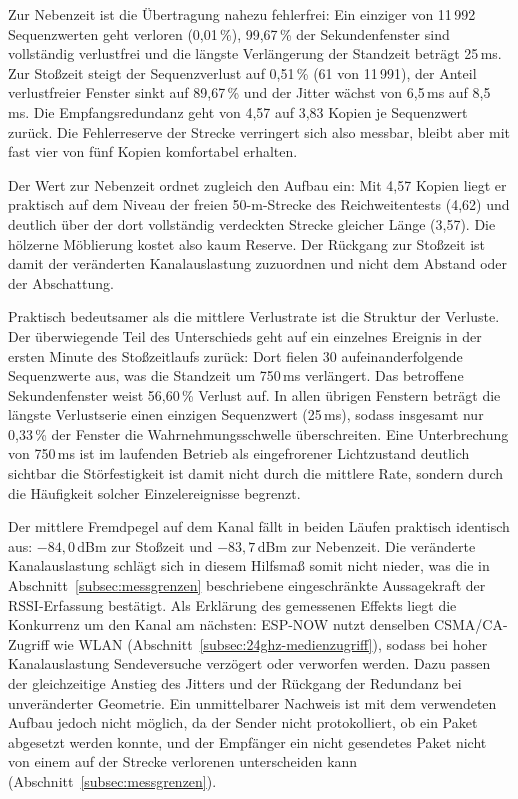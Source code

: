 Zur Nebenzeit ist die Übertragung nahezu fehlerfrei: Ein einziger von 11\,992
Sequenzwerten geht verloren (0,01\,\%), 99,67\,\% der Sekundenfenster sind
vollständig verlustfrei und die längste Verlängerung der Standzeit beträgt
25\,ms. Zur Stoßzeit
steigt der Sequenzverlust auf 0,51\,\% (61 von 11\,991), der Anteil verlustfreier
Fenster sinkt auf 89,67\,\% und der Jitter wächst von 6,5\,ms auf 8,5\,ms. Die
Empfangsredundanz geht von 4,57 auf 3,83 Kopien je Sequenzwert zurück. Die
Fehlerreserve der Strecke verringert sich also messbar, bleibt aber mit fast vier
von fünf Kopien komfortabel erhalten.

Der Wert zur Nebenzeit ordnet zugleich den Aufbau ein: Mit 4,57 Kopien liegt er
praktisch auf dem Niveau der freien 50-m-Strecke des Reichweitentests (4,62) und
deutlich über der dort vollständig verdeckten Strecke gleicher Länge (3,57). Die
hölzerne Möblierung kostet also kaum Reserve. Der Rückgang zur Stoßzeit ist damit
der veränderten Kanalauslastung zuzuordnen und nicht dem Abstand oder der
Abschattung.

Praktisch bedeutsamer als die mittlere Verlustrate ist die Struktur der Verluste.
Der überwiegende Teil des Unterschieds geht auf ein einzelnes Ereignis in der
ersten Minute des Stoßzeitlaufs zurück: Dort fielen 30 aufeinanderfolgende
Sequenzwerte aus, was die Standzeit um 750\,ms verlängert. Das betroffene
Sekundenfenster weist 56,60\,\% Verlust auf. In allen übrigen Fenstern beträgt die
längste Verlustserie einen einzigen Sequenzwert (25\,ms), sodass insgesamt nur
0,33\,\% der Fenster die Wahrnehmungsschwelle überschreiten. Eine Unterbrechung
von 750\,ms ist im laufenden Betrieb als eingefrorener Lichtzustand deutlich
sichtbar die Störfestigkeit ist damit nicht durch die mittlere Rate, sondern
durch die Häufigkeit solcher Einzelereignisse begrenzt.

Der mittlere Fremdpegel auf dem Kanal fällt in beiden Läufen praktisch identisch
aus: $-84{,}0$\,dBm zur Stoßzeit und $-83{,}7$\,dBm zur Nebenzeit. Die veränderte
Kanalauslastung schlägt sich in diesem Hilfsmaß somit nicht nieder, was die in
Abschnitt~\ref{subsec:messgrenzen} beschriebene eingeschränkte Aussagekraft der
RSSI-Erfassung bestätigt. Als Erklärung des gemessenen Effekts liegt die
Konkurrenz um den Kanal am nächsten: ESP-NOW nutzt denselben CSMA/CA-Zugriff wie
WLAN (Abschnitt~\ref{subsec:24ghz-medienzugriff}), sodass bei hoher
Kanalauslastung Sendeversuche verzögert oder verworfen werden. Dazu passen der
gleichzeitige Anstieg des Jitters und der Rückgang der Redundanz bei
unveränderter Geometrie. Ein unmittelbarer Nachweis ist mit dem verwendeten
Aufbau jedoch nicht möglich, da der Sender nicht protokolliert, ob ein Paket
abgesetzt werden konnte, und der Empfänger ein nicht gesendetes Paket nicht von
einem auf der Strecke verlorenen unterscheiden kann
(Abschnitt~\ref{subsec:messgrenzen}).


